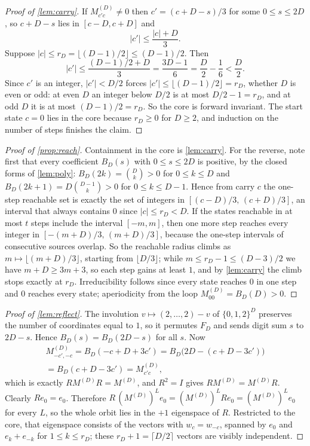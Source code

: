 \documentclass[11pt]{amsart}
\theoremstyle{definition}
\theoremstyle{remark}
\begin{document}
\begin{proof}[Proof of \cref{lem:carry}]
If $M^{(D)}_{c'c} \ne 0$ then $c' = (c+D-s)/3$ for some $0 \le s \le 2D$, so $c+D-s$ lies in $[c-D, c+D]$ and
\[
\lvert c' \rvert \le \frac{\lvert c \rvert + D}{3}.
\]
Suppose $\lvert c \rvert \le r_D = \lfloor (D-1)/2 \rfloor \le (D-1)/2$. Then
\[
\lvert c' \rvert \le \frac{(D-1)/2 + D}{3} = \frac{3D-1}{6} = \frac{D}{2} - \frac{1}{6} < \frac{D}{2}.
\]
Since $c'$ is an integer, $\lvert c' \rvert < D/2$ forces $\lvert c' \rvert \le \lfloor (D-1)/2 \rfloor = r_D$, whether $D$ is even or odd: at even $D$ an integer below $D/2$ is at most $D/2 - 1 = r_D$, and at odd $D$ it is at most $(D-1)/2 = r_D$. So the core is forward invariant. The start state $c = 0$ lies in the core because $r_D \ge 0$ for $D \ge 2$, and induction on the number of steps finishes the claim.
\end{proof}

\begin{proof}[Proof of \cref{prop:reach}]
Containment in the core is \cref{lem:carry}. For the reverse, note first that every coefficient $B_D(s)$ with $0 \le s \le 2D$ is positive, by the closed forms of \cref{lem:poly}: $B_D(2k) = \binom{D}{k} > 0$ for $0 \le k \le D$ and $B_D(2k+1) = D\binom{D-1}{k} > 0$ for $0 \le k \le D-1$. Hence from carry $c$ the one-step reachable set is exactly the set of integers in $[(c-D)/3,\, (c+D)/3]$, an interval that always contains $0$ since $\lvert c \rvert \le r_D < D$. If the states reachable in at most $t$ steps include the interval $[-m, m]$, then one more step reaches every integer in $[-(m+D)/3,\, (m+D)/3]$, because the one-step intervals of consecutive sources overlap. So the reachable radius climbs as $m \mapsto \lfloor (m+D)/3 \rfloor$, starting from $\lfloor D/3 \rfloor$; while $m \le r_D - 1 \le (D-3)/2$ we have $m + D \ge 3m + 3$, so each step gains at least $1$, and by \cref{lem:carry} the climb stops exactly at $r_D$. Irreducibility follows since every state reaches $0$ in one step and $0$ reaches every state; aperiodicity from the loop $M^{(D)}_{00} = B_D(D) > 0$.
\end{proof}

\begin{proof}[Proof of \cref{lem:reflect}]
The involution $v \mapsto (2,\dots,2)-v$ of $\{0,1,2\}^D$ preserves the number of coordinates equal to $1$, so it permutes $F_D$ and sends digit sum $s$ to $2D-s$. Hence $B_D(s) = B_D(2D-s)$ for all $s$. Now
\begin{multline*}
M^{(D)}_{-c',-c} = B_D(-c+D+3c') = B_D\bigl(2D - (c+D-3c')\bigr) \\
= B_D(c+D-3c') = M^{(D)}_{c'c},
\end{multline*}
which is exactly $RM^{(D)}R = M^{(D)}$, and $R^2 = I$ gives $RM^{(D)} = M^{(D)}R$. Clearly $Re_0 = e_0$. Therefore $R\,(M^{(D)})^L e_0 = (M^{(D)})^L R e_0 = (M^{(D)})^L e_0$ for every $L$, so the whole orbit lies in the $+1$ eigenspace of $R$. Restricted to the core, that eigenspace consists of the vectors with $w_c = w_{-c}$, spanned by $e_0$ and $e_k + e_{-k}$ for $1 \le k \le r_D$; these $r_D + 1 = \lceil D/2 \rceil$ vectors are visibly independent.
\end{proof}
\end{document}
